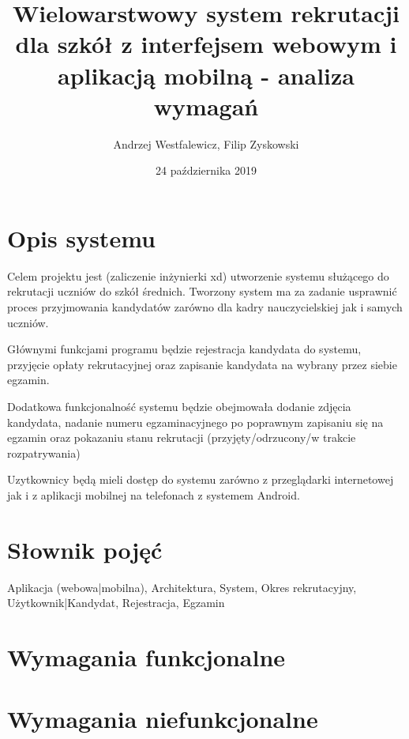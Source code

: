 \documentclass{article}
\title{Wielowarstwowy system rekrutacji dla szkół z interfejsem webowym i aplikacją mobilną - analiza wymagań}
\author{Andrzej Westfalewicz, Filip Zyskowski}
\date{24 października 2019}
\begin{document}
\begin{titlepage}
\maketitle
\end{titlepage}

\tableofcontents

\section{Opis systemu}

Celem projektu jest (zaliczenie inżynierki xd) utworzenie systemu służącego do rekrutacji uczniów do szkół średnich. Tworzony system ma za zadanie usprawnić proces przyjmowania kandydatów zarówno dla kadry nauczycielskiej jak i samych uczniów.

Głównymi funkcjami programu będzie rejestracja kandydata do systemu, przyjęcie opłaty rekrutacyjnej oraz zapisanie kandydata na wybrany przez siebie egzamin.

Dodatkowa funkcjonalność systemu będzie obejmowała dodanie zdjęcia kandydata, nadanie numeru egzaminacyjnego po poprawnym zapisaniu się na egzamin oraz pokazaniu stanu rekrutacji (przyjęty/odrzucony/w trakcie rozpatrywania)

Uzytkownicy będą mieli dostęp do systemu zarówno z przeglądarki internetowej jak i z aplikacji mobilnej na telefonach z systemem Android.

\section{Słownik pojęć}
Aplikacja (webowa|mobilna), Architektura, System, Okres rekrutacyjny, Użytkownik|Kandydat, Rejestracja, Egzamin
\section{Wymagania funkcjonalne}

\section{Wymagania niefunkcjonalne}
\end{document}
